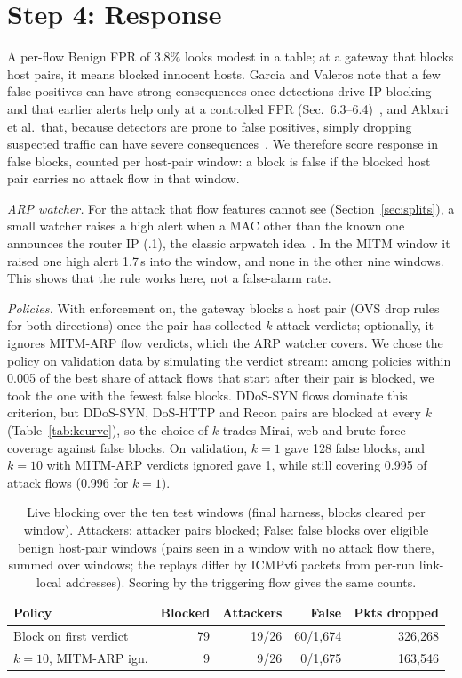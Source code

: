 \section{Step 4: Response}\label{sec:response}

A per-flow Benign FPR of 3.8\% looks modest in a table; at a gateway that blocks host pairs, it means blocked innocent hosts. Garcia and Valeros note that a few false positives can have strong consequences once detections drive IP blocking and that earlier alerts help only at a controlled FPR (Sec.~6.3--6.4)~\cite{garcia2023labeling}, and Akbari et al.\ that, because detectors are prone to false positives, simply dropping suspected traffic can have severe consequences~\cite{akbari2020atmos}. We therefore score response in false blocks, counted per host-pair window: a block is false if the blocked host pair carries no attack flow in that window.

\emph{ARP watcher.} For the attack that flow features cannot see (Section~\ref{sec:splits}), a small watcher raises a high alert when a MAC other than the known one announces the router IP (.1), the classic arpwatch idea~\cite{arpwatch}. In the MITM window it raised one high alert 1.7\,s into the window, and none in the other nine windows. This shows that the rule works here, not a false-alarm rate.

\emph{Policies.} With enforcement on, the gateway blocks a host pair (OVS drop rules for both directions) once the pair has collected $k$ attack verdicts; optionally, it ignores MITM-ARP flow verdicts, which the ARP watcher covers. We chose the policy on validation data by simulating the verdict stream: among policies within 0.005 of the best share of attack flows that start after their pair is blocked, we took the one with the fewest false blocks. DDoS-SYN flows dominate this criterion, but DDoS-SYN, DoS-HTTP and Recon pairs are blocked at every $k$ (Table~\ref{tab:kcurve}), so the choice of $k$ trades Mirai, web and brute-force coverage against false blocks. On validation, $k=1$ gave 128 false blocks, and $k=10$ with MITM-ARP verdicts ignored gave 1, while still covering 0.995 of attack flows (0.996 for $k=1$).

\begin{table}[t]
\centering
\caption{Live blocking over the ten test windows (final harness, blocks cleared per window). Attackers: attacker pairs blocked; False: false blocks over eligible benign host-pair windows (pairs seen in a window with no attack flow there, summed over windows; the replays differ by ICMPv6 packets from per-run link-local addresses). Scoring by the triggering flow gives the same counts.}
\label{tab:blocking}
\footnotesize
\setlength{\tabcolsep}{3pt}
\begin{tabular}{lrrrr}
\hline
Policy & Blocked & Attackers & False & Pkts dropped \\
\hline
Block on first verdict & 79 & 19/26 & 60/1,674 & 326,268 \\
$k=10$, MITM-ARP ign. & 9 & 9/26 & 0/1,675 & 163,546 \\
\hline
\end{tabular}
\end{table}

